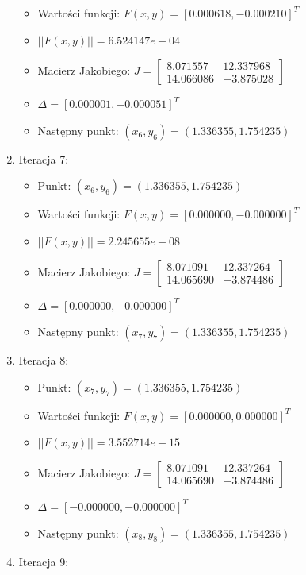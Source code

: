 \documentclass[a4paper,12pt]{article}
\begin{document}
\begin{enumerate}
\begin{itemize}
    \item Wartości funkcji: $F(x,y) = [0.000618, -0.000210]^T$
    \item $||F(x,y)|| = 6.524147e-04$
    \item Macierz Jakobiego: $J = \begin{bmatrix} 8.071557 & 12.337968 \\ 14.066086 & -3.875028 \end{bmatrix}$
    \item $\Delta = [0.000001, -0.000051]^T$
    \item Następny punkt: $(x_6, y_6) = (1.336355, 1.754235)$
  \end{itemize}
\item Iteracja 7:
  \begin{itemize}
    \item Punkt: $(x_6, y_6) = (1.336355, 1.754235)$
    \item Wartości funkcji: $F(x,y) = [0.000000, -0.000000]^T$
    \item $||F(x,y)|| = 2.245655e-08$
    \item Macierz Jakobiego: $J = \begin{bmatrix} 8.071091 & 12.337264 \\ 14.065690 & -3.874486 \end{bmatrix}$
    \item $\Delta = [0.000000, -0.000000]^T$
    \item Następny punkt: $(x_7, y_7) = (1.336355, 1.754235)$
  \end{itemize}
\item Iteracja 8:
  \begin{itemize}
    \item Punkt: $(x_7, y_7) = (1.336355, 1.754235)$
    \item Wartości funkcji: $F(x,y) = [0.000000, 0.000000]^T$
    \item $||F(x,y)|| = 3.552714e-15$
    \item Macierz Jakobiego: $J = \begin{bmatrix} 8.071091 & 12.337264 \\ 14.065690 & -3.874486 \end{bmatrix}$
    \item $\Delta = [-0.000000, -0.000000]^T$
    \item Następny punkt: $(x_8, y_8) = (1.336355, 1.754235)$
  \end{itemize}
\item Iteracja 9:
  \begin{itemize}

\end{itemize}
\end{enumerate}
\end{document}
